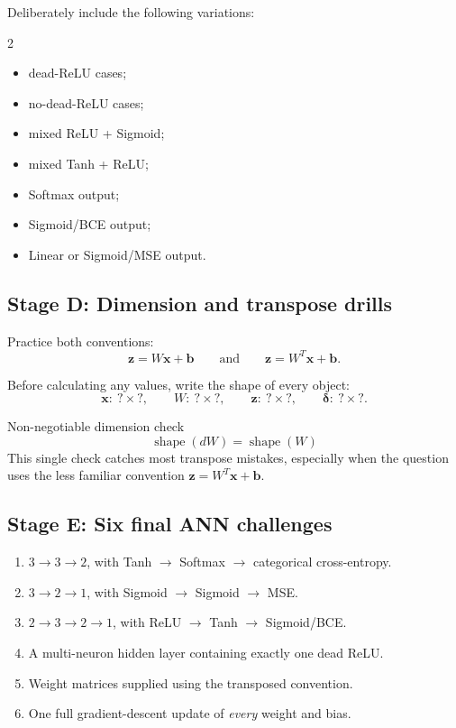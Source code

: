 \documentclass[11pt]{article}
\begin{document}
Deliberately include the following variations:

\begin{multicols}{2}
\begin{itemize}
  \item dead-ReLU cases;
  \item no-dead-ReLU cases;
  \item mixed ReLU + Sigmoid;
  \item mixed Tanh + ReLU;
  \item Softmax output;
  \item Sigmoid/BCE output;
  \item Linear or Sigmoid/MSE output.
\end{itemize}
\end{multicols}

\subsection{Stage D: Dimension and transpose drills}

Practice both conventions:
\[
\boldsymbol z=W\boldsymbol x+\boldsymbol b
\qquad\text{and}\qquad
\boldsymbol z=W^{T}\boldsymbol x+\boldsymbol b.
\]

Before calculating any values, write the shape of every object:
\[
\boldsymbol x:\ ?\!\times\!?,\qquad
W:\ ?\!\times\!?,\qquad
\boldsymbol z:\ ?\!\times\!?,\qquad
\boldsymbol\delta:\ ?\!\times\!?.
\]

\begin{prioritybox}{Non-negotiable dimension check}
\[
\boxed{\operatorname{shape}(dW)=\operatorname{shape}(W)}
\]
This single check catches most transpose mistakes, especially when the question uses the less familiar convention \(\boldsymbol z=W^T\boldsymbol x+\boldsymbol b\).
\end{prioritybox}

\subsection{Stage E: Six final ANN challenges}

\begin{enumerate}[label=\textbf{Challenge \Alph*:},leftmargin=*,align=left]
  \item \(3\!\to\!3\!\to\!2\), with Tanh \(\to\) Softmax \(\to\) categorical cross-entropy.
  \item \(3\!\to\!2\!\to\!1\), with Sigmoid \(\to\) Sigmoid \(\to\) MSE.
  \item \(2\!\to\!3\!\to\!2\!\to\!1\), with ReLU \(\to\) Tanh \(\to\) Sigmoid/BCE.
  \item A multi-neuron hidden layer containing exactly one dead ReLU.
  \item Weight matrices supplied using the transposed convention.
  \item One full gradient-descent update of \emph{every} weight and bias.
\end{enumerate}
\end{document}
